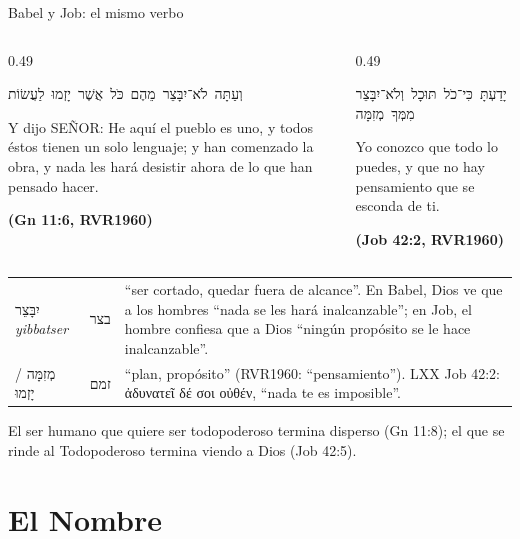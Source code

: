 \documentclass[hyperref={bookmarks=false},aspectratio=169]{beamer}
\newcommand{\heb}[1]{\mbox{\foreignlanguage{hebrew}{#1}}}
\newcommand{\grc}[1]{\foreignlanguage{ancientgreek}{#1}}
\newcommand{\SENOR}{S{\fontsize{0.78em}{1em}\selectfont EÑOR}}
\newcommand{\fuente}[1]{\par\hfill{\upshape\bfseries\footnotesize\textcolor{azul}{#1}}}
\begin{document}
\begin{frame}{Babel y Job: el mismo verbo}
\begin{columns}[t,onlytextwidth]
\begin{column}{0.49\textwidth}
\begin{center}\small\heb{וְעַתָּה לֹא־יִבָּצֵר מֵהֶם כֹּל אֲשֶׁר יָזְמוּ לַעֲשׂוֹת}\end{center}
\begin{cita}[fontupper=\scriptsize\itshape]Y dijo \SENOR: He aquí el pueblo es uno, y todos éstos tienen un solo lenguaje; y han comenzado la obra, y nada les hará desistir ahora de lo que han pensado hacer.\fuente{(Gn 11:6, RVR1960)}\end{cita}
\end{column}
\begin{column}{0.49\textwidth}
\begin{center}\small\heb{יָדַעְתָּ כִּי־כֹל תּוּכָל וְלֹא־יִבָּצֵר מִמְּךָ מְזִמָּה}\end{center}
\begin{cita}[fontupper=\scriptsize\itshape]Yo conozco que todo lo puedes, y que no hay pensamiento que se esconda de ti.\fuente{(Job 42:2, RVR1960)}\end{cita}
\end{column}
\end{columns}
\scriptsize\renewcommand{\arraystretch}{1.12}
\begin{tabular}{@{}>{\RaggedRight\arraybackslash}p{2.4cm}>{\RaggedRight\arraybackslash}p{1.0cm}>{\RaggedRight\arraybackslash}p{8.4cm}@{}}
\toprule
\heb{יִבָּצֵר} \emph{yibbatser} & \heb{בצר} & ``ser cortado, quedar fuera de alcance''. En Babel, Dios ve que a los hombres ``nada se les hará inalcanzable''; en Job, el hombre confiesa que a Dios ``ningún propósito se le hace inalcanzable''. \\
\heb{מְזִמָּה} / \heb{יָזְמוּ} & \heb{זמם} & ``plan, propósito'' (RVR1960: ``pensamiento''). LXX Job 42:2: \grc{ἀδυνατεῖ δέ σοι οὐθέν}, ``nada te es imposible''. \\
\bottomrule
\end{tabular}\par\smallskip
\small El ser humano que quiere ser todopoderoso termina disperso (Gn 11:8); el que se rinde al Todopoderoso termina viendo a Dios (Job 42:5).
\end{frame}

\section{El Nombre}
\end{document}
